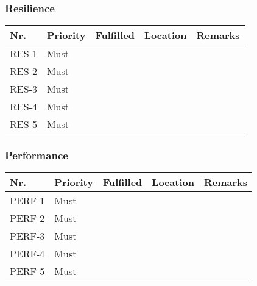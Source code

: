 \subsubsection{Resilience}
\begin{table}[H]
	\begin{tabular}{lllll}
						    
		Nr.   & Priority & Fulfilled & Location & Remarks \\ \hline
		RES-1 & Must     & ~        & ~         & ~       \\ 
		RES-2 & Must     & ~        & ~         & ~       \\ 
		RES-3 & Must     & ~        & ~         & ~       \\ 
		RES-4 & Must     & ~        & ~         & ~       \\ 
		RES-5 & Must     & ~        & ~         & ~       \\
						
	\end{tabular}
\end{table}

\subsubsection{Performance}
\begin{table}[H]
	\begin{tabular}{lllll}
						    
		Nr.    & Priority & Fulfilled & Location & Remarks \\ \hline
		PERF-1 & Must     & ~        & ~         & ~       \\ 
		PERF-2 & Must     & ~        & ~         & ~       \\ 
		PERF-3 & Must     & ~        & ~         & ~       \\
		PERF-4 & Must     & ~        & ~         & ~       \\
		PERF-5 & Must     & ~        & ~         & ~       \\
						
	\end{tabular}
\end{table}

